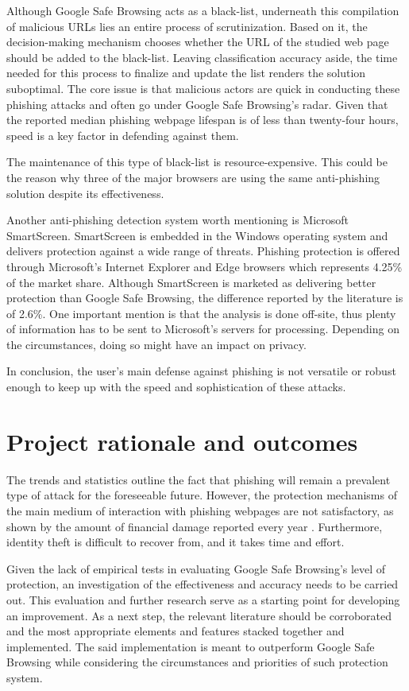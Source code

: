 Although Google Safe Browsing acts as a black-list, underneath this compilation
of malicious URLs lies an entire process of scrutinization. Based on it, the
decision-making mechanism chooses whether the URL of the studied web page should
be added to the black-list. Leaving classification accuracy aside, the time needed for this process to finalize and update the list renders the solution suboptimal. The
core issue is that malicious actors are quick in conducting these phishing attacks and
often go under Google Safe Browsing's radar. Given that the reported median phishing webpage lifespan is of less than twenty-four hours, speed is a key factor in defending against them.

The maintenance of this type of black-list is resource-expensive. This could be the
reason why three of the major browsers are using the same anti-phishing solution
despite its effectiveness.

Another anti-phishing detection system worth mentioning is Microsoft SmartScreen. SmartScreen is embedded in the Windows operating system and delivers protection against a wide range of threats. Phishing protection is offered through Microsoft's Internet Explorer and Edge browsers which represents 4.25\% of the market share. Although SmartScreen is marketed as delivering better protection than Google Safe Browsing, the difference reported by the literature is of 2.6\%. One important mention is that the analysis is done off-site, thus plenty of information has to be sent to Microsoft's servers for processing. Depending on the circumstances, doing so might have an impact on privacy.

In conclusion, the user's main defense against phishing is not versatile or robust enough to keep up with the speed and sophistication of these attacks. 


\section{Project rationale and outcomes}
The trends and statistics outline the fact that phishing will remain a prevalent
type of attack for the foreseeable future. However, the protection
mechanisms of the main medium of interaction with phishing webpages are not
satisfactory, as shown by the amount of financial damage reported every year
\citep{APWG_Q42019}. Furthermore, identity theft is difficult to recover from,
and it takes time and effort.

Given the lack of empirical tests in evaluating Google Safe Browsing's level of protection, an investigation of the effectiveness and accuracy needs to be carried out. This evaluation and further research serve as a starting point for developing an improvement. As a next step, the relevant literature should be corroborated and the most appropriate elements and features stacked together and implemented. The said implementation is meant to outperform Google Safe Browsing while considering the circumstances and priorities of such protection system.

